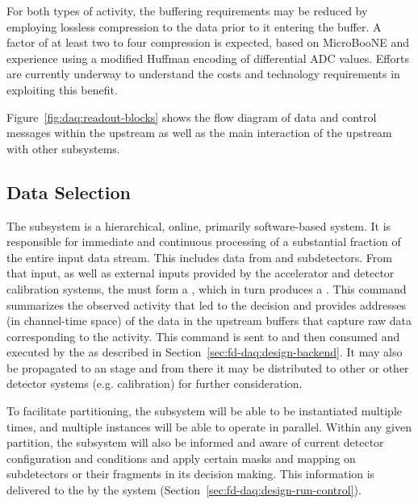 \begin{itemize}
For both types of activity, the buffering requirements may be reduced by
employing lossless compression to the data prior to it entering the buffer. A
factor of at least two to four compression is expected, based on
MicroBooNE \cite{bib:uBsnreadout2019} 
and  experience using a modified Huffman encoding of
differential ADC values.  Efforts are currently underway to understand the
costs and technology requirements in exploiting this benefit.

\end{itemize}

Figure~\ref{fig:daq:readout-blocks} shows the flow diagram of data and control messages within the upstream  as well as the main interaction of the upstream  with other subsystems.

\subsection{Data Selection}
\label{sec:sp-daq:design-data-selection}

The  subsystem is a hierarchical, online, primarily
software-based system. It is responsible for immediate and continuous processing of a substantial fraction of the entire input data stream. 
This includes data from  and  subdetectors.
From that input, as well as external inputs provided by
the accelerator and detector calibration systems, the  must form a ,
which in turn produces a .
This command summarizes the observed activity that led to the decision
and provides addresses (in channel-time space) of the data in the
upstream  buffers that capture raw data
corresponding to the activity.
This command is sent to and then consumed and executed by the  as described in Section~\ref{sec:fd-daq:design-backend}. 
It may also be propagated to an  stage and from there it may be
distributed to other  or other detector systems
(e.g. calibration) for further consideration.

To facilitate partitioning, the  subsystem will be
able to be instantiated multiple times, and multiple instances will be
able to operate in parallel. Within any
given partition, the  subsystem will also be
informed and aware of current detector configuration and conditions and
apply certain masks and mapping on subdetectors or their fragments in
its decision making. This information is delivered to the
 by the  system (Section~\ref{sec:fd-daq:design-run-control}).

